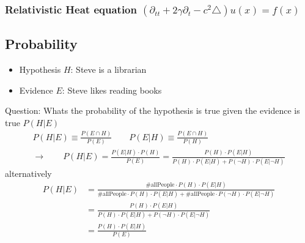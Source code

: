 \documentclass[10pt,a4paper]{article}
\theoremstyle{definition}
\begin{document}
\subsubsection{Relativistic Heat equation \texorpdfstring{$\left(\partial_{tt}+2\gamma\partial_t-c^2\triangle\right) u(x)= f(x)$}{TEXT}}

\subsection{Probability}

\begin{itemize}
\item Hypothesis $H$: Steve is a librarian
\item Evidence $E$: Steve likes reading books
\end{itemize}
Question: Whats the probability of the hypothesis is true given the evidence is true $P(H|E)$ 
\begin{align}
   P(H|E)\equiv\frac{P(E\cap H)}{P(E)}\qquad P(E|H)\equiv\frac{P(E\cap H)}{P(H)}\\
   \rightarrow\qquad P(H|E)=\frac{P(E|H)\cdot P(H)}{P(E)}=\frac{P(H)\cdot P(E|H)}{P(H)\cdot P(E|H)+ P(\neg H)\cdot P(E|\neg H)}
\end{align}
alternatively
\begin{align}
  P(H|E)&=\frac{\#\text{allPeople}\cdot P(H)\cdot P(E|H)}{\#\text{allPeople}\cdot P(H)\cdot P(E|H)+\#\text{allPeople}\cdot P(\neg H)\cdot P(E|\neg H)}\\
  &=\frac{P(H)\cdot P(E|H)}{P(H)\cdot P(E|H)+ P(\neg H)\cdot P(E|\neg H)}\\
  &=\frac{P(H)\cdot P(E|H)}{P(E)}
\end{align}

\begin{center}
\end{center}
\end{document}
